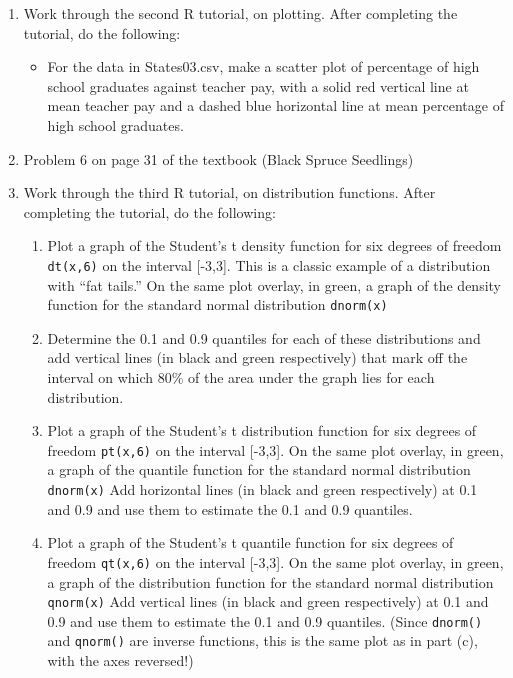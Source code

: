 \documentclass[12pt]{article}
\begin{document}
\begin{enumerate}
\item Work through the second R tutorial, on plotting. After completing the tutorial, do the following:
\begin{itemize}
\item For the data in States03.csv, make a scatter plot of percentage of high school graduates against teacher pay, with a solid red vertical line at mean teacher pay and a dashed blue horizontal line at mean percentage of high school graduates.

\end{itemize}

\item Problem 6 on page 31 of the textbook (Black Spruce Seedlings)

\item Work through the third R tutorial,  on distribution functions. After completing the tutorial, do the following:
\begin{enumerate}

\item Plot a graph of the Student's t density function for six degrees of freedom \verb!dt(x,6)! on the interval [-3,3]. This is a classic example of a distribution with ``fat tails.'' On the same plot overlay, in green, a graph of the density function for the standard normal distribution \verb!dnorm(x)!

\item Determine the 0.1 and 0.9 quantiles for each of these distributions and add vertical lines (in black and green respectively) that mark off the interval on which 80\% of the area under the graph lies for each distribution.

\item Plot a graph of the Student's t distribution function for six degrees of freedom \verb!pt(x,6)! on the interval [-3,3]. On the same plot overlay, in green, a graph of the quantile function for the standard normal distribution \verb!dnorm(x)! Add horizontal lines (in black and green respectively) at 0.1 and 0.9 and use them to estimate the 0.1 and 0.9 quantiles.

\item Plot a graph of the Student's t quantile function for six degrees of freedom \verb!qt(x,6)! on the interval [-3,3]. On the same plot overlay, in green, a graph of the distribution function for the standard normal distribution \verb!qnorm(x)! Add vertical lines (in black and green respectively) at 0.1 and 0.9 and use them to estimate the 0.1 and 0.9 quantiles. (Since \verb!dnorm()! and \verb!qnorm()! are inverse functions, this is the same plot as in part (c), with the axes reversed!)



\end{enumerate}
\end{enumerate}
\end{document}
